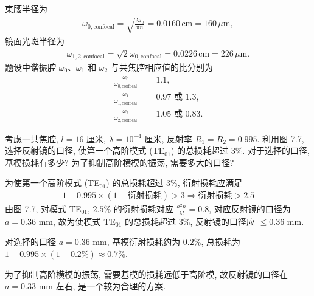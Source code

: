 \documentclass[twoside]{note}
\begin{document}
\begin{sol}
\begin{itemize}
        束腰半径为
        \begin{align}
            \omega_{0,\text{confocal}}=\sqrt{\frac{\lambda z_0}{\pi n}}=0.0160\,\text{cm}=160\,\mu\text{m},
        \end{align}
        镜面光斑半径为
        \begin{align}
            \omega_{1,2,\text{confocal}}=\sqrt{2}\omega_{0,\text{confocal}}=0.0226\,\text{cm}=226\,\mu\text{m}.
        \end{align}
        题设中谐振腔 $\omega_0$、$\omega_1$ 和 $\omega_2$ 与共焦腔相应值的比分别为
        \begin{align}
            \frac{\omega_0}{\omega_{0,\text{confocal}}}=&1.1,\\
            \frac{\omega_1}{\omega_{1,\text{confocal}}}=&0.97\text{ 或 }1.3,\\
            \frac{\omega_2}{\omega_{2,\text{confocal}}}=&1.05\text{ 或 }0.83.
        \end{align}
    \end{itemize}
\end{sol}

\begin{exe}
    考虑一共焦腔, $l=16$ 厘米, $\lambda=10^{-4}$ 厘米, 反射率 $R_1=R_2=0.995$. 利用图 7.7, 选择反射镜的口径, 使第一个高阶模式 (TE$_{01}$) 的总损耗超过 $3\%$. 对于选择的口径, 基模损耗有多少? 为了抑制高阶横模的振荡, 需要多大的口径?
\end{exe}
\begin{sol}
    为使第一个高阶模式 (TE$_{01}$) 的总损耗超过 $3\%$, 衍射损耗应满足
    \begin{gather}
        1-0.995\times(1-\text{衍射损耗})>3%
        \Longrightarrow\text{衍射损耗}>2.5%
    \end{gather}
    由图 7.7, 对模式 TE$_{01}$, $2.5\%$ 的衍射损耗对应 $\frac{a^2n}{\lambda l}=0.8$, 对应反射镜的口径为 $a=0.36$ mm, 故为使模式 TE$_{01}$ 的总损耗超过 $3\%$, 反射镜的口径应 $\leq 0.36$ mm.

    对选择的口径 $a=0.36$ mm, 基模衍射损耗约为 $0.2\%$, 总损耗为 $1-0.995\times(1-0.2\%)\approx 0.7\%$.

    为了抑制高阶横模的振荡, 需要基模的损耗远低于高阶模, 故反射镜的口径在 $a=0.33$ mm 左右, 是一个较为合理的方案.
\end{sol}
\end{document}
